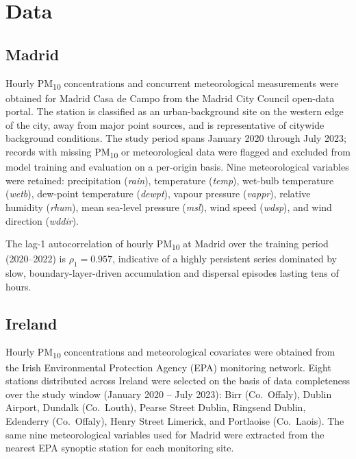 \documentclass[12pt,a4paper]{article}
\newcommand{\PMten}{PM\textsubscript{10}}
\begin{document}
\section{Data}
\label{sec:data}

\subsection{Madrid}

Hourly \PMten{} concentrations and concurrent meteorological measurements were
obtained for Madrid Casa de Campo from the Madrid City Council open-data portal.
The station is classified as an urban-background site on the western edge of
the city, away from major point sources, and is representative of citywide
background conditions.  The study period spans January 2020 through July 2023;
records with missing \PMten{} or meteorological data were flagged and excluded
from model training and evaluation on a per-origin basis.  Nine meteorological
variables were retained: precipitation (\textit{rain}), temperature
(\textit{temp}), wet-bulb temperature (\textit{wetb}), dew-point temperature
(\textit{dewpt}), vapour pressure (\textit{vappr}), relative humidity
(\textit{rhum}), mean sea-level pressure (\textit{msl}), wind speed
(\textit{wdsp}), and wind direction (\textit{wddir}).

The lag-1 autocorrelation of hourly \PMten{} at Madrid over the training
period (2020--2022) is $\rho_1 = 0.957$, indicative of a highly persistent
series dominated by slow, boundary-layer-driven accumulation and dispersal
episodes lasting tens of hours.

\subsection{Ireland}

Hourly \PMten{} concentrations and meteorological covariates were obtained from
the Irish Environmental Protection Agency (EPA) monitoring network.  Eight
stations distributed across Ireland were selected on the basis of data
completeness over the study window (January 2020 -- July 2023):
Birr (Co.\ Offaly), Dublin Airport, Dundalk (Co.\ Louth), Pearse Street
Dublin, Ringsend Dublin, Edenderry (Co.\ Offaly), Henry Street Limerick, and
Portlaoise (Co.\ Laois).  The same nine meteorological variables used for
Madrid were extracted from the nearest EPA synoptic station for each monitoring
site.
\end{document}
